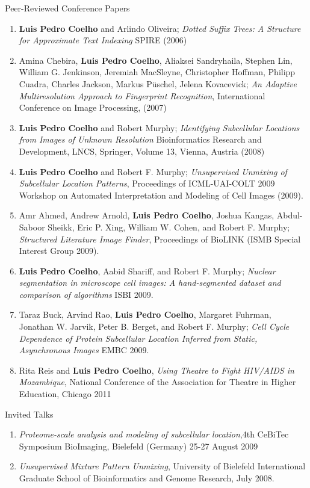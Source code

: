 \documentclass{article}
\renewcommand\subsection[1]{%
    \par\vspace{.1em}%
    {\hspace{1em}\subsubhead #1}%
    \par\vspace{.2em}%
}
\begin{document}
\subsection{Peer-Reviewed Conference Papers}
\begin{enumerate}
\item \textbf{Luis Pedro Coelho} and Arlindo Oliveira; \emph{Dotted Suffix
Trees: A Structure for Approximate Text Indexing} SPIRE (2006)
\item Amina Chebira, \textbf{Luis Pedro Coelho}, Aliaksei Sandryhaila, Stephen
Lin, William G. Jenkinson, Jeremiah MacSleyne, Christopher Hoffman, Philipp
Cuadra, Charles Jackson, Markus P\"uschel, Jelena Kovacevick; \emph{An Adaptive
Multiresolution Approach to Fingerprint Recognition}, International Conference
on Image Processing, (2007)
\item \textbf{Luis Pedro Coelho} and Robert Murphy; \emph{Identifying
Subcellular Locations from Images of Unknown Resolution} Bioinformatics
Research and Development, LNCS, Springer, Volume 13, Vienna, Austria (2008)
\item \textbf{Luis Pedro Coelho} and Robert F. Murphy; \emph{Unsupervised
Unmixing of Subcellular Location Patterns}, Proceedings of ICML-UAI-COLT 2009
Workshop on Automated Interpretation and Modeling of Cell Images (2009).
\item Amr Ahmed, Andrew Arnold, \textbf{Luis Pedro Coelho}, Joshua Kangas,
Abdul-Saboor Sheikk, Eric P. Xing, William W. Cohen, and Robert F. Murphy;
\emph{Structured Literature Image Finder}, Proceedings of BioLINK (ISMB Special
Interest Group 2009).
\item \textbf{Luis Pedro Coelho}, Aabid Shariff, and Robert F. Murphy;
\emph{Nuclear segmentation in microscope cell images: A hand-segmented dataset
and comparison of algorithms} ISBI 2009.
\item Taraz Buck, Arvind Rao, \textbf{Luis Pedro Coelho}, Margaret Fuhrman,
Jonathan W. Jarvik, Peter B. Berget, and Robert F. Murphy; \emph{Cell Cycle
Dependence of Protein Subcellular Location Inferred from Static, Asynchronous
Images} EMBC 2009.
\item Rita Reis and \textbf{Luis Pedro Coelho}, \emph{Using Theatre to Fight
HIV/AIDS in Mozambique}, National Conference of the Association for Theatre in
Higher Education, Chicago 2011
\end{enumerate}


\subsection{Invited Talks}
\begin{enumerate}
\item \emph{Proteome-scale analysis and modeling of subcellular location},4th
CeBiTec Symposium BioImaging, Bielefeld (Germany) 25-27 August 2009
\item \emph{Unsupervised Mixture Pattern Unmixing}, University of Bielefeld
International Graduate School of Bioinformatics and Genome Research, July 2008.
\end{enumerate}
\end{document}
